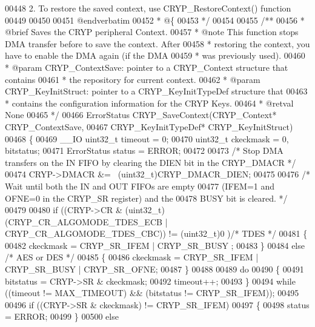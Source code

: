 \begin{DoxyCode}
00448 \textcolor{comment}{  2. To restore the saved context, use CRYP\_RestoreContext() function }
00449 \textcolor{comment}{}
00450 \textcolor{comment}{}
00451 \textcolor{comment}{@endverbatim}
00452 \textcolor{comment}{  * @\{}
00453 \textcolor{comment}{  */}
00454 
00455 \textcolor{comment}{/**}
00456 \textcolor{comment}{  * @brief  Saves the CRYP peripheral Context. }
00457 \textcolor{comment}{  * @note   This function stops DMA transfer before to save the context. After }
00458 \textcolor{comment}{  *         restoring the context, you have to enable the DMA again (if the DMA}
00459 \textcolor{comment}{  *         was previously used).}
00460 \textcolor{comment}{  * @param  CRYP\_ContextSave: pointer to a CRYP\_Context structure that contains}
00461 \textcolor{comment}{  *         the repository for current context.}
00462 \textcolor{comment}{  * @param  CRYP\_KeyInitStruct: pointer to a CRYP\_KeyInitTypeDef structure that }
00463 \textcolor{comment}{  *         contains the configuration information for the CRYP Keys.  }
00464 \textcolor{comment}{  * @retval None}
00465 \textcolor{comment}{  */}
00466 ErrorStatus CRYP_SaveContext(CRYP\_Context* CRYP\_ContextSave,
00467                              CRYP\_KeyInitTypeDef* CRYP\_KeyInitStruct)
00468 \{
00469   \_\_IO uint32\_t timeout = 0;
00470   uint32\_t ckeckmask = 0, bitstatus;
00471   ErrorStatus status = ERROR;
00472 
00473   \textcolor{comment}{/* Stop DMA transfers on the IN FIFO by clearing the DIEN bit in the CRYP\_DMACR */}
00474   CRYP->DMACR &= ~(uint32\_t)CRYP_DMACR_DIEN;
00475 
00476   \textcolor{comment}{/* Wait until both the IN and OUT FIFOs are empty  }
00477 \textcolor{comment}{    (IFEM=1 and OFNE=0 in the CRYP\_SR register) and the }
00478 \textcolor{comment}{     BUSY bit is cleared. */}
00479 
00480   \textcolor{keywordflow}{if} ((CRYP->CR & (uint32\_t)(CRYP_CR_ALGOMODE_TDES_ECB | 
      CRYP_CR_ALGOMODE_TDES_CBC)) != (uint32\_t)0 )\textcolor{comment}{/* TDES */}
00481   \{
00482     ckeckmask =  CRYP_SR_IFEM | CRYP_SR_BUSY ;
00483   \}
00484   \textcolor{keywordflow}{else} \textcolor{comment}{/* AES or DES */}
00485   \{
00486     ckeckmask =  CRYP_SR_IFEM | CRYP_SR_BUSY | CRYP_SR_OFNE;
00487   \}
00488 
00489   \textcolor{keywordflow}{do}
00490   \{
00491     bitstatus = CRYP->SR & ckeckmask;
00492     timeout++;
00493   \}
00494   \textcolor{keywordflow}{while} ((timeout != MAX_TIMEOUT) && (bitstatus != CRYP_SR_IFEM));
00495 
00496   \textcolor{keywordflow}{if} ((CRYP->SR & ckeckmask) != CRYP_SR_IFEM)
00497   \{
00498     status = ERROR;
00499   \}
00500   \textcolor{keywordflow}{else}

\end{DoxyCode}
